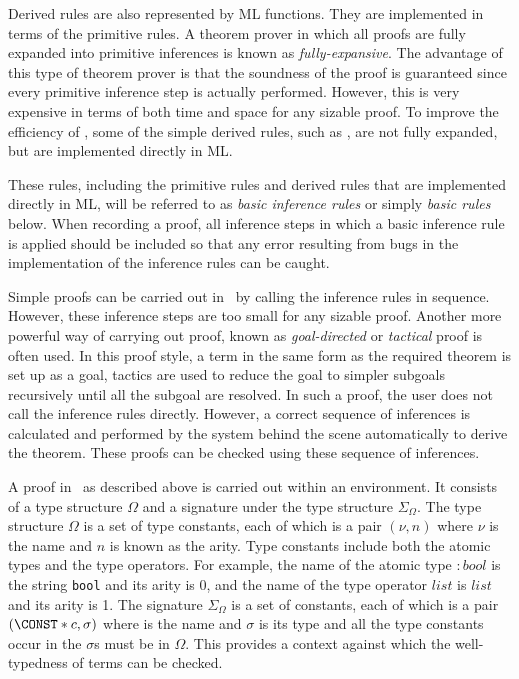 Derived rules are also represented by ML functions. They are implemented in
terms of the primitive rules.  A theorem prover in which
all proofs are fully expanded into primitive inferences is known as
{\it fully-expansive\/}\cite{Boulton:HOLeffiency}. The advantage of
this type of theorem prover is that the soundness of the proof is
guaranteed since every primitive inference step is actually performed.
However, this is very expensive in terms of both time and space for
any sizable proof. To improve the efficiency of \HOL, some of the
simple derived rules, such as , are not fully expanded,
but are implemented directly in ML.

These rules, including the primitive rules and derived rules that are
implemented directly in ML, will be referred to as {\it basic
inference rules\/} or simply {\it basic rules\/} below. When
recording a proof, all inference steps in which a basic
inference rule is applied should be included so that any error
resulting from bugs in the implementation of the inference rules can
be caught.

Simple proofs can be carried out in \HOL\ by calling the inference
rules in sequence. However, these inference steps
are too small for any sizable proof. Another more powerful way of
carrying out proof, known as {\it goal-directed\/} or {\it tactical\/}
proof is often used. In this proof style, a term in the same form as
the required theorem is set up as a goal, tactics are used to reduce
the goal to simpler subgoals recursively until all the subgoal are
resolved. In such a proof, the user does not call the inference rules
directly. However, a correct sequence of inferences is calculated and
performed by the system behind the scene automatically to derive the theorem.
These proofs can be checked using these sequence of inferences.

A proof in \HOL\ as described above is carried out within an
environment. It consists of a type structure $\Omega$ and a signature
under the type structure $\Sigma_{\Omega}$. The type structure
$\Omega$ is a set of type constants, each of which is a pair $(\nu,n)$
where $\nu$ is the name 
and $n$ is known as the arity. Type constants include both the atomic
types and the type operators. For example, the name of the atomic type
$:bool$ is the string {\tt bool} and its arity is 0, and the name of
the type operator $list$ is $list$ and its arity is 1.
The signature $\Sigma_{\Omega}$ is a set of constants, each of which
is a pair $(\CONST*{c},\sigma)$ where  is the name and
$\sigma$ is its type and all the type constants occur in the $\sigma$s
must be in $\Omega$. 
This provides a context against which the well-typedness of terms can
be checked.

